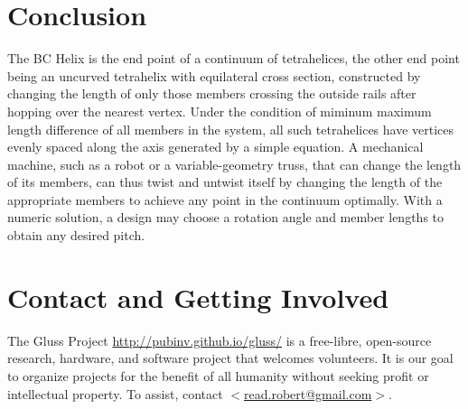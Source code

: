 \documentclass[11pt]{article}
\begin{document}
\section{Conclusion}

The BC Helix is the end point of a continuum of tetrahelices, the
other end point being an uncurved tetrahelix with equilateral cross
section, constructed by changing the length of only those members
crossing the outside rails after hopping over the nearest
vertex. Under the condition of miminum maximum length difference of
all members in the system, all such tetrahelices have vertices evenly
spaced along the axis generated by a simple equation.  A mechanical
machine, such as a robot or a variable-geometry truss, that can change
the length of its members, can thus twist and untwist itself by
changing the length of the appropriate members to achieve any point in
the continuum optimally. With a numeric solution, a design may choose
a rotation angle and member lengths to obtain any desired pitch.

\section{Contact and Getting Involved}

The Gluss Project \url{http://pubinv.github.io/gluss/}
is a free-libre, open-source research, hardware, and software project that welcomes volunteers.
It is our goal to organize projects for the benefit of all humanity without seeking profit or intellectual property.
To assist, contact \href{mailto:read.robert@gmail.com}{$<$read.robert@gmail.com$>$}.



\end{document}
